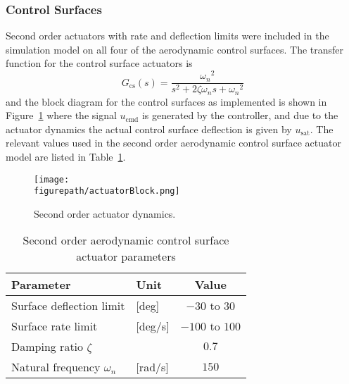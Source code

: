 \subsubsection{Control Surfaces} Second order actuators with rate and deflection limits were included in the simulation model on all four of the aerodynamic control surfaces.
The transfer function for the control surface actuators is
\begin{equation*}
  G_{\text{cs}}(s)=\frac{{\omega_{n}}^{2}}{s^{2}+2\zeta\omega_{n}s+{\omega_{n}}^{2}}
\end{equation*}
and the block diagram for the control surfaces as implemented is shown in Figure~\ref{fig.actuatorBlock} where the signal $u_{\text{cmd}}$ is generated by the controller, and due to the actuator dynamics the actual control surface deflection is given by $u_{\text{sat}}$.
The relevant values used in the second order aerodynamic control surface actuator model are listed in Table~\ref{tab:actuator}.

\begin{figure}[H]
  \begin{center}
    \texttt{[image: \\figurepath/actuatorBlock.png]}
    \vspace{-0.1in}
    \caption{Second order actuator dynamics.\label{fig.actuatorBlock}}
  \end{center}
\end{figure}

\begin{table}[H]
  \centering
  \caption{Second order aerodynamic control surface actuator parameters\label{tab:actuator}}
  \begin{tabular}{llc}
    \toprule
    Parameter & Unit & Value \\ \midrule
    Surface deflection limit & [deg] & $-30$ to $30$ \\
    Surface rate limit & [deg/s] & $-100$ to $100$ \\
    Damping ratio $\zeta$ & & $0.7$ \\
    Natural frequency $\omega_{n}$ & [rad/s] & $150$ \\
    \bottomrule
  \end{tabular}
\end{table}

